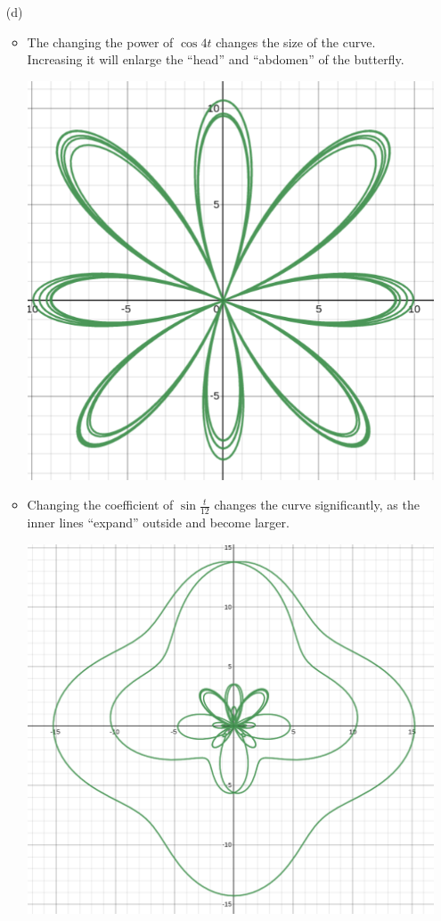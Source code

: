 \documentclass{article}
\begin{document}
\begin{itemize}
	copy to desmos: \verb|y+\frac{1}{e}-2+\frac{\sqrt{2}}{8}=-\frac{5x}{\frac{48}{e}-96+6\sqrt{2}}|

\item[(d)]
	\begin{itemize}
	\item The changing the power of $\cos4t$ changes the size of the curve. Increasing it will enlarge the ``head'' and ``abdomen'' of the butterfly.
	
	\begin{center}
		\centering
		\includegraphics*[width=0.45\linewidth]{fig1.png}
	\end{center}

	\item Changing the coefficient of $\sin\frac{t}{12}$ changes the curve significantly, as the inner lines ``expand'' outside and become larger.
	
	\begin{center}
		\centering
		\includegraphics*[width=0.45\linewidth]{fig2.png}
	\end{center}


\end{itemize}
\end{itemize}
\end{document}
